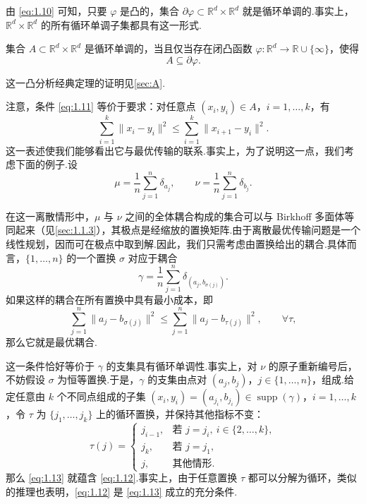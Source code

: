 由 \eqref{eq:1.10} 可知，只要 $\varphi$ 是凸的，集合 $\partial\varphi\subset\mathbb R^d\times\mathbb R^d$ 就是循环单调的.事实上，$\mathbb R^d\times\mathbb R^d$ 的所有循环单调子集都具有这一形式.

\begin{theorem}[Rockafellar]\label{thm:1.10}
集合 $A\subset\mathbb R^d\times\mathbb R^d$ 是循环单调的，当且仅当存在闭凸函数 $\varphi:\mathbb R^d\to\mathbb R\cup\{\infty\}$，使得
$$
A\subseteq\partial\varphi.
$$
\end{theorem}

这一凸分析经典定理的证明见\autoref{sec:A}.

注意，条件 \eqref{eq:1.11} 等价于要求：对任意点 $(x_i,y_i)\in A$，$i=1,\ldots,k$，有
\begin{equation}\label{eq:1.12}
\sum_{i=1}^k\|x_i-y_i\|^2\le\sum_{i=1}^k\|x_{i+1}-y_i\|^2.
\end{equation}
这一表述使我们能够看出它与最优传输的联系.事实上，为了说明这一点，我们考虑下面的例子.设
$$
\mu=\frac1n\sum_{j=1}^n\delta_{a_j},\qquad
\nu=\frac1n\sum_{j=1}^n\delta_{b_j}.
$$

在这一离散情形中，$\mu$ 与 $\nu$ 之间的全体耦合构成的集合可以与 Birkhoff 多面体等同起来（见\autoref{sec:1.1.3}），其极点是经缩放的置换矩阵.由于离散最优传输问题是一个线性规划，因而可在极点中取到解.因此，我们只需考虑由置换给出的耦合.具体而言，$\{1,\ldots,n\}$ 的一个置换 $\sigma$ 对应于耦合
$$
\gamma=\frac1n\sum_{j=1}^n\delta_{(a_j,b_{\sigma(j)})}.
$$
如果这样的耦合在所有置换中具有最小成本，即
\begin{equation}\label{eq:1.13}
\sum_{j=1}^n\|a_j-b_{\sigma(j)}\|^2
\le\sum_{j=1}^n\|a_j-b_{\tau(j)}\|^2,\qquad\forall\tau,
\end{equation}
那么它就是最优耦合.

这一条件恰好等价于 $\gamma$ 的支集具有循环单调性.事实上，对 $\nu$ 的原子重新编号后，不妨假设 $\sigma$ 为恒等置换.于是，$\gamma$ 的支集由点对 $(a_j,b_j)$，$j\in\{1,\ldots,n\}$，组成.给定任意由 $k$ 个不同点组成的子集 $(x_i,y_i)=(a_{j_i},b_{j_i})\in\operatorname{supp}(\gamma)$，$i=1,\ldots,k$，令 $\tau$ 为 $\{j_1,\ldots,j_k\}$ 上的循环置换，并保持其他指标不变：
$$
\tau(j)=\begin{cases}
j_{i-1},&\text{若 }j=j_i,\ i\in\{2,\ldots,k\},\\
j_k,&\text{若 }j=j_1,\\
j,&\text{其他情形.}
\end{cases}
$$
那么 \eqref{eq:1.13} 就蕴含 \eqref{eq:1.12}.事实上，由于任意置换 $\tau$ 都可以分解为循环，类似的推理也表明，\eqref{eq:1.12} 是 \eqref{eq:1.13} 成立的充分条件.

